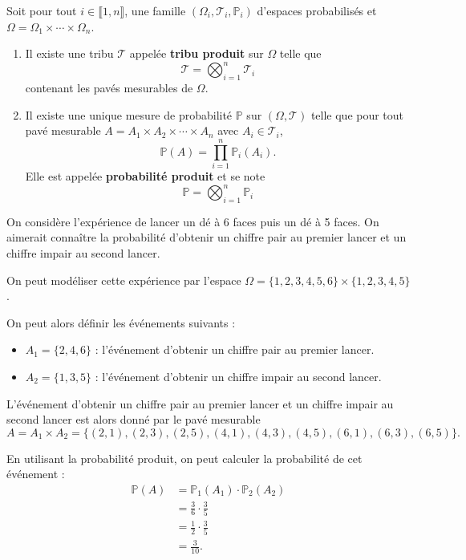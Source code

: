 \documentclass[a4paper,12pt]{article}
\begin{document}
\begin{theoreme}{}{}
    Soit pour tout $i \in \llbracket 1, n \rrbracket$, une famille $(\Omega_i, \mathcal{T}_i, \mathbb{P}_i)$ d'espaces probabilisés et
    $\Omega = \Omega_1 \times \cdots \times \Omega_n$.

    \begin{enumerate}
        \item Il existe une tribu $\mathcal{T}$ appelée \textbf{tribu produit} sur $\Omega$ telle que
        $$
        \mathcal{T} = \bigotimes_{i=1}^n \mathcal{T}_i
        $$
        contenant les pavés mesurables de $\Omega$.

        \item %
        Il existe une unique mesure de probabilité $\mathbb{P}$ sur $(\Omega, \mathcal{T})$ telle que pour tout pavé mesurable $A = A_1 \times A_2 \times \cdots \times A_n$ avec $A_i \in \mathcal{T}_i$,
        $$
        \mathbb{P}(A) = \prod_{i=1}^n \mathbb{P}_i(A_i).
        $$
        Elle est appelée \textbf{probabilité produit} et se note
        $$
        \mathbb{P} = \bigotimes_{i=1}^n \mathbb{P}_i
        $$
    \end{enumerate}
\end{theoreme}

\begin{exemple}
    On considère l'expérience de lancer un dé à 6 faces puis un dé à 5 faces. On aimerait connaître la probabilité d'obtenir un chiffre pair au premier lancer et un chiffre impair au second lancer.

    On peut modéliser cette expérience par l'espace $\Omega = \{1, 2, 3, 4, 5, 6\} \times \{1, 2, 3, 4, 5\}$.

    On peut alors définir les événements suivants :
    \begin{itemize}
        \item $A_1 = \{2, 4, 6\}$ : l'événement d'obtenir un chiffre pair au premier lancer.
        \item $A_2 = \{1, 3, 5\}$ : l'événement d'obtenir un chiffre impair au second lancer.
    \end{itemize}
    L'événement d'obtenir un chiffre pair au premier lancer et un chiffre impair au second lancer est alors donné par le pavé mesurable
    $$
    A = A_1 \times A_2 = \{(2, 1), (2, 3), (2, 5), (4, 1), (4, 3), (4, 5), (6, 1), (6, 3), (6, 5)\}.
    $$

    En utilisant la probabilité produit, on peut calculer la probabilité de cet événement :
    \begin{align*}
    \mathbb{P}(A) &= \mathbb{P}_1(A_1) \cdot \mathbb{P}_2(A_2) \\
    &= \frac{3}{6} \cdot \frac{3}{5} \\
    &= \frac{1}{2} \cdot \frac{3}{5} \\
    &= \frac{3}{10}.
    \end{align*}
\end{exemple}
\end{document}
